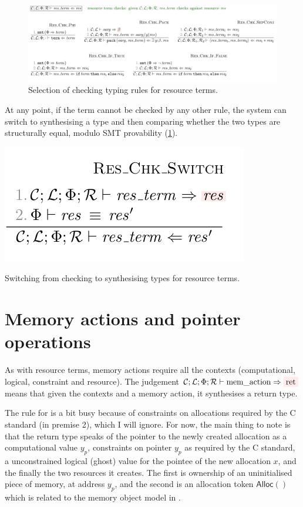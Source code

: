 \begin{figure}[tp]
    \includegraphics{figures/kernel-res-term-check}
    \caption{Selection of  checking typing rules for
        resource terms.}\label{fig:typing-res-term-check}
\end{figure}

At any point, if the term cannot be checked by any other rule, the system can
switch to synthesising a type and then comparing whether the two types are
structurally equal, modulo SMT provability (\cref{fig:typing-res-term-check}).

\begin{marginfigure}
    \includegraphics{figures/kernel-res-term-switch}
    \caption{Switching from checking to synthesising types for resource
        terms.}\label{fig:typing-res-term-switch}
\end{marginfigure}

\section{Memory actions and pointer operations}

As with resource terms, memory actions require all the contexts (computational,
logical, constraint and resource). The judgement $\mathcal{C} ; \mathcal{L} ;
\Phi ; \mathcal{R} \vdash \mathrm{mem\_action} \Rightarrow
\outpol{\mathrm{ret}}$ means that given the contexts and a memory action,
it synthesises a return type.

The rule for  is a bit busy because of %
constraints on allocations required by the C standard (in premise 2), which I
will ignore. For now, the main thing to note is that the return type speaks of
the pointer to the newly created allocation as a computational value $y_p$,
constraints on pointer $y_p$ as required by the C standard, a unconstrained
logical (ghost) value for the pointee of the new allocation $x$, and the
finally the two resources it creates. The first is ownership of an
uninitialised piece of memory, at address $y_p$, and the second is an
allocation token $\mathsf{Alloc()}$ which is related to the memory object model
in .

